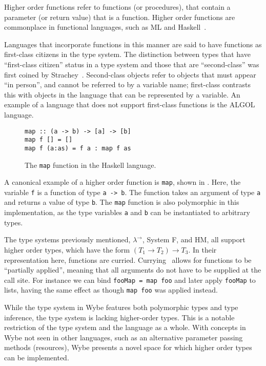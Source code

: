 Higher order functions refer to functions (or procedures), that contain a parameter (or return value) that is a function. Higher order functions are commonplace in functional languages, such as ML and Haskell~\cite{jones2003haskell}. 

Languages that incorporate functions in this manner are said to have functions as first-class citizens in the type system. The distinction between types that have ``first-class citizen'' status in a type system and those that are ``second-class'' was first coined by Strachey~\cite{strachey2000fundamental}. Second-class objects refer to objects that must appear ``in person'', and cannot be referred to by a variable name; first-class contrasts this with objects in the language that can be represented by a variable. An example of a language that does not support first-class functions is the ALGOL language.

\begin{figure}[h]
  \centering
  \begin{varwidth}{\linewidth}
    \begin{verbatim}
map :: (a -> b) -> [a] -> [b]
map f [] = []
map f (a:as) = f a : map f as
\end{verbatim}
  \end{varwidth}
  \caption{The \texttt{map} function in the Haskell language.}
  \label{fig:map}
\end{figure}

A canonical example of a higher order function is \texttt{map}, shown in . Here, the variable \texttt{f} is a function of type \texttt{a -> b}. The function takes an argument of type \texttt{a} and returns a value of type \texttt{b}. The \texttt{map} function is also polymorphic in this implementation, as the type variables \texttt{a} and \texttt{b} can be instantiated to arbitrary types.

The type systems previously mentioned, $\lambda^\rightarrow$, System F, and HM, all support higher order types, which have the form $(T_1 \rightarrow T_2) \rightarrow T_3$. In their representation here, functions are curried. Currying~\cite{frege1893grundgesetze,curry1958combinatory} allows for functions to be ``partially applied'', meaning that all arguments do not have to be supplied at the call site. For instance we can bind \texttt{fooMap = map foo} and later apply \texttt{fooMap} to lists, having the same effect as though \texttt{map foo} was applied instead. 

While the type system in Wybe features both polymorphic types and type inference, the type system is lacking higher-order types. This is a notable restriction of the type system and the language as a whole. With concepts in Wybe not seen in other languages, such as an alternative parameter passing methods (resources), Wybe presents a novel space for which higher order types can be implemented.

